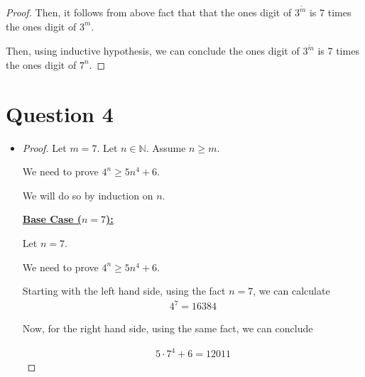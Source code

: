 \documentclass[12pt]{article}
\begin{document}
\begin{itemize}
\begin{mdframed}
\begin{proof}
        \bigskip

        Then, it follows from above fact that that the ones digit of $3^{\tilde{m}}$
        is 7 times the ones digit of $3^m$.

        \bigskip

        Then, using inductive hypothesis, we can conclude the ones digit of $3^{\tilde{m}}$
        is 7 times the ones digit of $7^n$.

        \end{proof}
    \end{mdframed}
\end{itemize}

\section*{Question 4}
\begin{itemize}
    \item

    \begin{proof}
        Let $m = 7$. Let $n \in \mathbb{N}$. Assume $n \geq m$.

        \bigskip

        We need to prove $4^n \geq 5n^4 + 6$.

        \bigskip

        We will do so by induction on $n$.

        \bigskip

        \underline{\textbf{Base Case ($n = 7$):}}

        \bigskip

        Let $n = 7$.

        \bigskip

        We need to prove $4^n \geq 5n^4 + 6$.

        \bigskip

        Starting with the left hand side, using the fact $n = 7$, we
        can calculate
        \setcounter{equation}{0}
        \begin{align}
            4^7 = 16384
        \end{align}

        \bigskip

        Now, for the right hand side, using the same fact, we can conclude

        \begin{align}
            5 \cdot 7^4 + 6 = 12011
        \end{align}


\end{proof}
\end{itemize}
\end{document}
